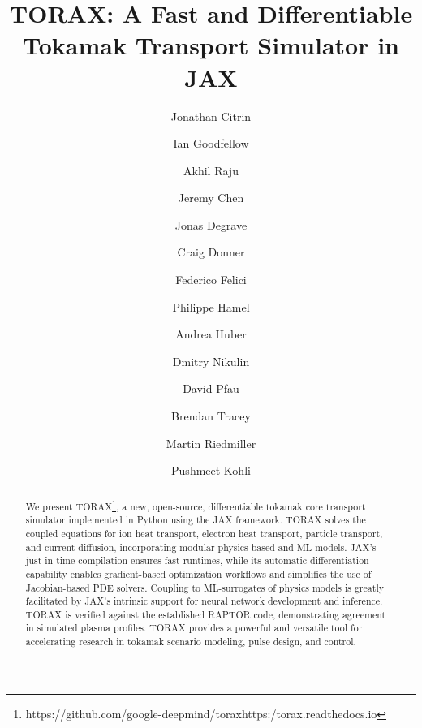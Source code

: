 \documentclass[aps, reprint, nofootinbib]{revtex4-2}
\begin{document}
\title{TORAX: A Fast and Differentiable Tokamak Transport Simulator in JAX}

\author{Jonathan Citrin}
\author{Ian Goodfellow}
\author{Akhil Raju}
\author{Jeremy Chen}
\author{Jonas Degrave}
\author{Craig Donner}
\author{Federico Felici}
\author{Philippe Hamel}
\author{Andrea Huber}
\author{Dmitry Nikulin}
\author{David Pfau}
\author{Brendan Tracey}
\author{Martin Riedmiller}
\author{Pushmeet Kohli}


\begin{abstract}
We present TORAX\footnote{https://github.com/google-deepmind/torax{\newline}https:/torax.readthedocs.io}, a new, open-source, differentiable tokamak core transport simulator implemented in Python using the JAX framework. TORAX solves the coupled equations for ion heat transport, electron heat transport, particle transport, and current diffusion, incorporating modular physics-based and ML models. JAX's just-in-time compilation ensures fast runtimes, while its automatic differentiation capability enables gradient-based optimization workflows and simplifies the use of Jacobian-based PDE solvers. Coupling to ML-surrogates of physics models is greatly facilitated by JAX's intrinsic support for neural network development and inference. TORAX is verified against the established RAPTOR code, demonstrating agreement in simulated plasma profiles. TORAX provides a powerful and versatile tool for accelerating research in tokamak scenario modeling, pulse design, and control.
\end{abstract}
\end{document}
